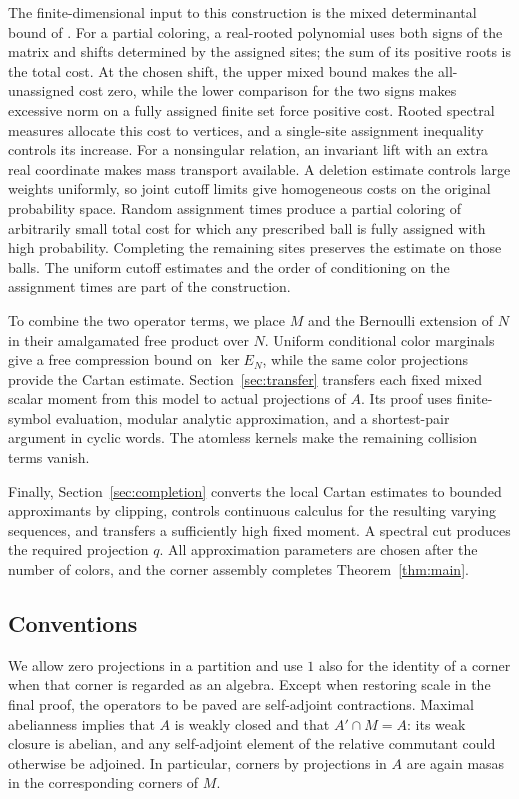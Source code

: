 The finite-dimensional input to this construction is the mixed determinantal bound of \cite[Theorem~25]{RS17}. For a partial coloring, a real-rooted polynomial uses both signs of the matrix and shifts determined by the assigned sites; the sum of its positive roots is the total cost. At the chosen shift, the upper mixed bound makes the all-unassigned cost zero, while the lower comparison for the two signs makes excessive norm on a fully assigned finite set force positive cost. Rooted spectral measures allocate this cost to vertices, and a single-site assignment inequality controls its increase. For a nonsingular relation, an invariant lift with an extra real coordinate makes mass transport available. A deletion estimate controls large weights uniformly, so joint cutoff limits give homogeneous costs on the original probability space. Random assignment times produce a partial coloring of arbitrarily small total cost for which any prescribed ball is fully assigned with high probability. Completing the remaining sites preserves the estimate on those balls. The uniform cutoff estimates and the order of conditioning on the assignment times are part of the construction.

To combine the two operator terms, we place $M$ and the Bernoulli extension of $N$ in their amalgamated free product over $N$. Uniform conditional color marginals give a free compression bound on $\ker E_N$, while the same color projections provide the Cartan estimate. Section~\ref{sec:transfer} transfers each fixed mixed scalar moment from this model to actual projections of $A$. Its proof uses finite-symbol evaluation, modular analytic approximation, and a shortest-pair argument in cyclic words. The atomless kernels make the remaining collision terms vanish.

Finally, Section~\ref{sec:completion} converts the local Cartan estimates to bounded approximants by clipping, controls continuous calculus for the resulting varying sequences, and transfers a sufficiently high fixed moment. A spectral cut produces the required projection $q$. All approximation parameters are chosen after the number of colors, and the corner assembly completes Theorem~\ref{thm:main}.

\subsection{Conventions}

We allow zero projections in a partition and use $1$ also for the identity of a corner when that corner is regarded as an algebra. Except when restoring scale in the final proof, the operators to be paved are self-adjoint contractions. Maximal abelianness implies that $A$ is weakly closed and that $A'\cap M=A$: its weak closure is abelian, and any self-adjoint element of the relative commutant could otherwise be adjoined. In particular, corners by projections in $A$ are again masas in the corresponding corners of $M$.

